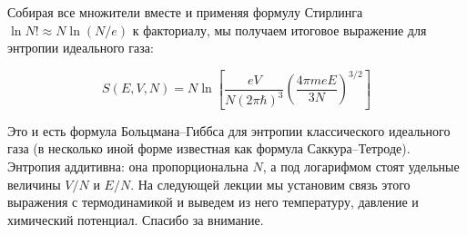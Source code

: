 \documentclass[../general/general]{subfiles}
\begin{document}
Собирая все множители вместе и применяя формулу Стирлинга $\ln N! \approx N\ln(N/e)$ к факториалу, мы получаем итоговое выражение для энтропии идеального газа:

\begin{equation}
    S(E, V, N) = N \ln \left[ \frac{eV}{N(2\pi\hbar)^3} \left( \frac{4\pi m e E}{3N} \right)^{3/2} \right]
\end{equation}

Это и есть формула Больцмана–Гиббса для энтропии классического идеального газа (в несколько иной форме известная как формула Саккура–Тетроде). Энтропия аддитивна: она пропорциональна $N$, а под логарифмом стоят удельные величины $V/N$ и $E/N$. На следующей лекции мы установим связь этого выражения с термодинамикой и выведем из него температуру, давление и химический потенциал. Спасибо за внимание.
\end{document}
